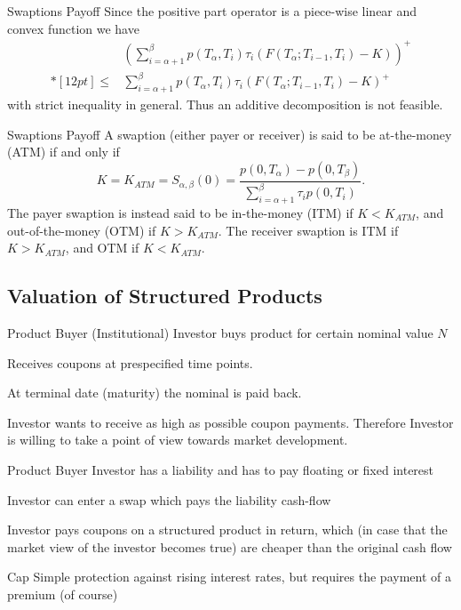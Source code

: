 Swaptions Payoff
	Since the positive part operator is a piece-wise linear and convex function we have
		$$\begin{array}{ll}
		&\displaystyle
		\left(\sum_{i=\alpha+1}^{\beta}p(T_{\alpha},T_i)\tau_i(F(T_{\alpha};T_{i-1},T_i)-K)\right)^+\\*[12pt]
		\leq&\displaystyle \sum_{i=\alpha+1}^{\beta}p(T_{\alpha},T_i)\tau_i(F(T_{\alpha};T_{i-1},T_i)-K)^+
		\end{array}
		$$
	with strict inequality in general. Thus an additive decomposition is not feasible.



Swaptions Payoff
	A swaption (either payer or receiver) is said to be at-the-money (ATM) if and only if
		$$
		K=K_{ATM}=S_{\alpha,\beta}(0)=\frac{p(0,T_{\alpha})-p(0,T_{\beta})}{\sum_{i=\alpha+1}^{\beta}\tau_ip(0,T_i)}.
		$$
	The payer swaption is instead said to be in-the-money (ITM) if
	$K<K_{ATM}$, and out-of-the-money (OTM) if $K>K_{ATM}$. The
	receiver swaption is ITM if $K>K_{ATM}$, and OTM if $K<K_{ATM}$.


\subsection{Valuation of Structured Products}
Product Buyer
	(Institutional) Investor buys product for certain nominal value $N$
	
	Receives coupons at prespecified time points.
	
	At terminal date (maturity) the nominal is paid back.
	
	Investor wants to receive as high as possible coupon payments. Therefore Investor is willing to take a point of view towards market development.


Product Buyer
	Investor has a liability and has to pay floating or fixed interest
	
	Investor can enter a swap which pays the liability cash-flow
	
	Investor pays coupons on a structured product in return, which (in case that the market view of the investor becomes true) are cheaper than the original cash flow


Cap
	Simple protection against rising interest rates, but requires the payment of a premium (of course)
	
